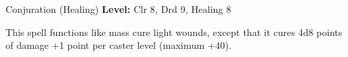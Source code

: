 {Conjuration (Healing)}
{
	\textbf{Level:}
	Clr 8, Drd 9, Healing 8\\
}
{
	This spell functions like mass cure light wounds, except that it cures 4d8 points of damage +1 point per caster level (maximum +40).

}
